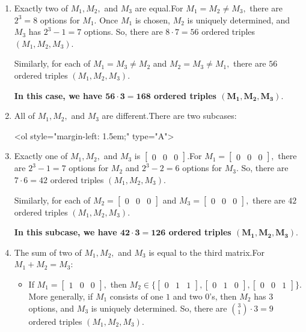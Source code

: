 \begin{enumerate}
\begin{enumerate}
 \textbf{In this case, we have $\boldsymbol{8}$ ordered triples $\boldsymbol{(M_1,M_2,M_3).}$}

  

 
        \item Exactly two of $M_1,M_2,$ and $M_3$ are equal.For $M_1=M_2\neq M_3,$ there are $2^3=8$ options for $M_1.$ Once $M_1$ is chosen, $M_2$ is uniquely determined, and $M_3$ has $2^3-1=7$ options. So, there are $8\cdot7=56$ ordered triples $(M_1,M_2,M_3).$

 Similarly, for each of $M_1=M_3\neq M_2$ and $M_2=M_3\neq M_1,$ there are $56$ ordered triples $(M_1,M_2,M_3).$

 \textbf{In this case, we have $\boldsymbol{56\cdot3=168}$ ordered triples $\boldsymbol{(M_1,M_2,M_3).}$}

  

 
        \item All of $M_1,M_2,$ and $M_3$ are different.There are two subcases: 

  

 <ol style="margin-left: 1.5em;" type="A"> 
        \item Exactly one of $M_1,M_2,$ and $M_3$ is $\begin{bmatrix}0 & 0 & 0\end{bmatrix}.$For $M_1=\begin{bmatrix}0 & 0 & 0\end{bmatrix},$ there are $2^3-1=7$ options for $M_2$ and $2^3-2=6$ options for $M_3.$ So, there are $7\cdot6=42$ ordered triples $(M_1,M_2,M_3).$

 Similarly, for each of $M_2=\begin{bmatrix}0 & 0 & 0\end{bmatrix}$ and $M_3=\begin{bmatrix}0 & 0 & 0\end{bmatrix},$ there are $42$ ordered triples $(M_1,M_2,M_3).$

 \textbf{In this subcase, we have $\boldsymbol{42\cdot3=126}$ ordered triples $\boldsymbol{(M_1,M_2,M_3).}$}

  

 
        \item The sum of two of $M_1,M_2,$ and $M_3$ is equal to the third matrix.For $M_1+M_2=M_3:$

            \begin{itemize} 
        \item If $M_1=\begin{bmatrix}1 & 0 & 0\end{bmatrix},$ then $M_2\in\{\begin{bmatrix}0 & 1 & 1\end{bmatrix},\begin{bmatrix}0 & 1 & 0\end{bmatrix},\begin{bmatrix}0 & 0 & 1\end{bmatrix}\}.$More generally, if $M_1$ consists of one $1$ and two $0$'s, then $M_2$ has $3$ options, and $M_3$ is uniquely determined. So, there are $\binom31\cdot3=9$ ordered triples $(M_1,M_2,M_3).$


\end{itemize}
\end{enumerate}
\end{enumerate}
